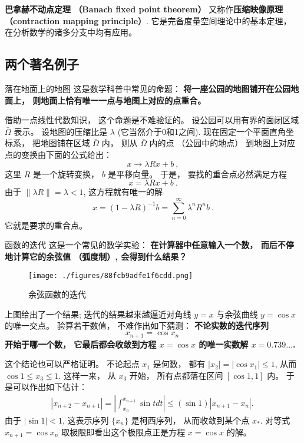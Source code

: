 

\textbf{巴拿赫不动点定理 （Banach fixed point theorem）} 又称作\textbf{压缩映像原理 （contraction mapping principle）}. 它是完备度量空间理论中的基本定理， 在分析数学的诸多分支中均有应用。

\subsection{两个著名例子}
\begin{example}{落在地面上的地图}
这是数学科普中常见的命题： \textbf{将一座公园的地图铺开在公园地面上， 则地面上恰有唯一一点与地图上对应的点重合。} 

借助一点线性代数知识， 这个命题是不难验证的。 设公园可以用有界的面闭区域 $\bar\Omega$ 表示。 设地图的压缩比是 $\lambda$ (它当然介于0和1之间). 现在固定一个平面直角坐标系， 把地图铺在区域 $\bar\Omega$ 内， 则从 $\bar\Omega$ 内的点 （公园中的地点） 到地图上对应点的变换由下面的公式给出：
$$
x\to \lambda Rx+b~,
$$
这里 $R$ 是一个旋转变换， $b$ 是平移向量。 于是， 要找的重合点必然满足方程
$$
x=\lambda Rx+b~.
$$
由于 $\|\lambda R\|=\lambda<1$, 这方程就有唯一的解
$$
x=(1-\lambda R)^{-1}b=\sum_{n=0}^{\infty}\lambda^nR^nb~.
$$
它就是要求的重合点。
\end{example}

\begin{example}{函数的迭代}
这是一个常见的数学实验： \textbf{在计算器中任意输入一个数， 而后不停地计算它的余弦值 （弧度制）, 会得到什么结果？ }

\begin{figure}[ht]
\centering
\texttt{[image: ./figures/88fcb9adfe1f6cdd.png]}
\caption{余弦函数的迭代} \label{fig_ConMap_1}
\end{figure}

上图给出了一个结果; 迭代的结果越来越逼近对角线 $y=x$ 与余弦曲线 $y=\cos x$ 的唯一交点。 验算若干数值， 不难作出如下猜测： \textbf{不论实数的迭代序列
$$
x_{n+1}=\cos x_n~
$$
开始于哪一个数， 它最后都会收敛到方程 $x=\cos x$ 的唯一实数解 $x=0.739...$.}

这个结论也可以严格证明。 不论起点 $x_1$ 是何数， 都有 $|x_2|=|\cos x_1|\leq 1$, 从而 $\cos 1\leq x_3\leq 1$. 这样一来， 从 $x_3$ 开始， 所有点都落在区间 $[\cos 1,1]$ 内。 于是可以作出如下估计：
$$
\begin{aligned}
|x_{n+2}-x_{n+1}|
=\left|\int_{x_{n}}^{x_{n+1}}\sin tdt\right|
\leq (\sin 1)|x_{n+1}-x_n|.
\end{aligned}~
$$
由于 $|\sin1|<1$, 这表示序列 $\{x_n\}$ 是柯西序列， 从而收敛到某个点 $x_*$. 对等式 $x_{n+1}=\cos x_n$ 取极限即看出这个极限点正是方程 $x=\cos x$ 的解。
\end{example}


